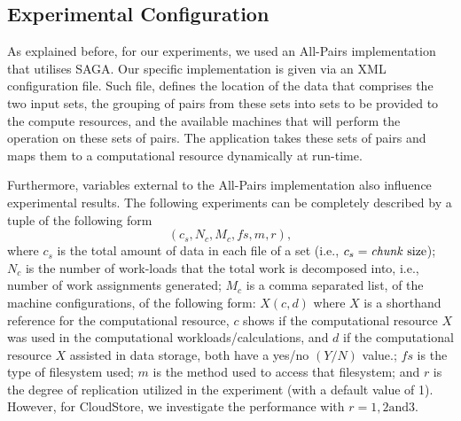 \documentclass{rspublic}
\begin{document}
\subsection{Experimental Configuration}

As explained before, for our experiments, we used an All-Pairs
implementation that utilises SAGA. Our specific implementation is given
via an XML configuration file. Such file, defines the location of the
data that comprises the two input sets, the grouping of pairs from these
sets into sets to be provided to the compute resources, and the
available machines that will perform the operation on these sets of
pairs. The application takes these sets of pairs and maps them to a
computational resource dynamically at run-time.  

Furthermore, variables external to the All-Pairs implementation also
influence experimental results. The following experiments can be
completely described by a tuple of the following form
 \begin{equation}
(c_s, N_c, M_c, fs, m,r),
\label{Eq:tuple}
\end{equation}
where $c_s$ is the total amount of data in each file of a set (i.e.,
$c_s=\mbox{\textit{chunk} size}$); $N_c$ is the number of work-loads
that the total work is decomposed into, i.e., number of work
assignments generated; $M_c$ is a comma separated list, of the machine 
configurations, of the
following form: $X(c, d)$ where $X$ is a shorthand reference for the
computational resource, $c$ shows if the computational resource $X$
was used in the computational workloads/calculations, and $d$ if the
computational resource $X$ assisted in data storage, both have a
yes/no $(Y/N)$ value.; $fs$ is the type of filesystem used; $m$ is the
method used to access that filesystem; and $r$ is the degree of
replication utilized in the experiment (with a default value of 1).
 However, for CloudStore, we investigate the performance with 
 $r = 1, 2 \mbox{and} 3$.
\end{document}
